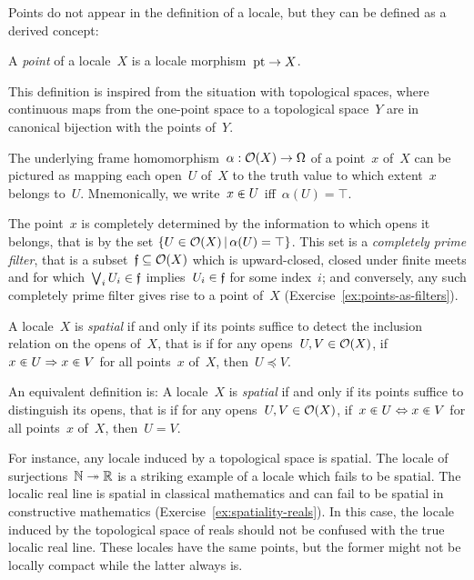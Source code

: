 \documentclass{ws-rv9x6}
\begin{document}
{Points do not appear in the definition of a locale, but they can be defined as
a derived concept:
\begin{definition}A \emph{point} of a locale~$X$ is a locale morphism~$\mathrm{pt} \to
X$.\end{definition}

This definition is inspired from the situation with topological spaces, where
continuous maps from the one-point space to a topological space~$Y$ are in
canonical bijection with the points of~$Y$.

The underlying frame homomorphism~$\alpha : \mathcal{O}(X) \to \Omega$ of a point~$x$
of~$X$ can be pictured as mapping each open~$U$ of~$X$ to the truth value to which
extent~$x$ belongs to~$U$. Mnemonically, we write~$x \inplus U$ iff~$\alpha(U)
= \top$.

The point~$x$ is completely determined by the information to which opens it
belongs, that is by the set {$\{ U \in \mathcal{O}(X) \,|\, \alpha(U) = \top \}$}. This set is a \emph{completely
prime filter}, that is a subset~$\mathfrak{f} \subseteq \mathcal{O}(X)$ which is upward-closed,
closed under finite meets and for which~$\bigvee_i U_i \in \mathfrak{f}$ implies~$U_i
\in \mathfrak{f}$ for some index~$i$; and conversely, any such completely prime filter
gives rise to a point of~$X$ (Exercise~\ref{ex:points-as-filters}).

\begin{definition}A locale~$X$ is \emph{spatial} if and only if its points
suffice to detect the inclusion relation on the opens of~$X$, that is if for any opens~$U, V \in \mathcal{O}(X)$,
if~$x \inplus U \Rightarrow x \inplus V$ for all points~$x$ of~$X$, then~$U
\preceq V$.\end{definition}

An equivalent definition is: A locale~$X$ is \emph{spatial} if and only if its points
suffice to distinguish its opens, that is if for any opens~$U, V \in \mathcal{O}(X)$, if~$x \inplus U
\Leftrightarrow x \inplus V$ for all points~$x$ of~$X$, then~$U = V$.

For instance, any locale induced by a topological space is spatial. The locale
of surjections~$\mathbb{N} \twoheadrightarrow \mathbb{R}$ is a striking example of a locale which fails to be
spatial. The localic real line is spatial in classical mathematics and can
fail to be spatial in constructive mathematics
(Exercise~\ref{ex:spatiality-reals}). In this case, the locale induced by the
topological space of reals should not be confused with the true localic real
line. These locales have the same points, but the former might not be locally compact
while the latter always is.

}
\end{document}
